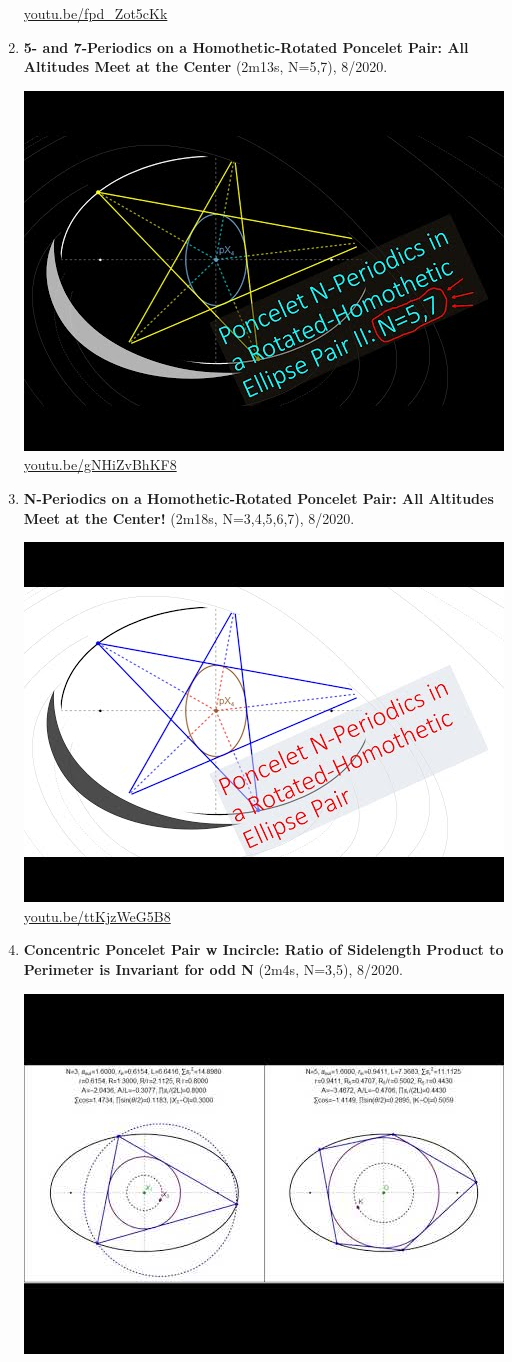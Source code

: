 \documentclass[12pt]{amsart}
\begin{document}
\begin{enumerate}[resume]
\begin{center}
\href{https://youtu.be/fpd_Zot5cKk}{\url{youtu.be/fpd\_Zot5cKk}}\end{center}
% 
\item \textbf{5- and 7-Periodics on a Homothetic-Rotated Poncelet Pair: All Altitudes Meet at the Center} (2m13s, N=5,7), 8/2020. 
\begin{center}\includegraphics[width=.5\textwidth]{pics/gNHiZvBhKF8.jpg} \\ 
\href{https://youtu.be/gNHiZvBhKF8}{\url{youtu.be/gNHiZvBhKF8}}\end{center}
% 
\item \textbf{N-Periodics on a Homothetic-Rotated Poncelet Pair: All Altitudes Meet at the Center!} (2m18s, N=3,4,5,6,7), 8/2020. 
\begin{center}\includegraphics[width=.5\textwidth]{pics/ttKjzWeG5B8.jpg} \\ 
\href{https://youtu.be/ttKjzWeG5B8}{\url{youtu.be/ttKjzWeG5B8}}\end{center}
% 
\item \textbf{Concentric Poncelet Pair w Incircle: Ratio of Sidelength Product to Perimeter is Invariant for odd N} (2m4s, N=3,5), 8/2020. 
\begin{center}\includegraphics[width=.5\textwidth]{pics/7Jg2nRkkUhQ.jpg} \\ 

\end{center}
\end{enumerate}
\end{document}

